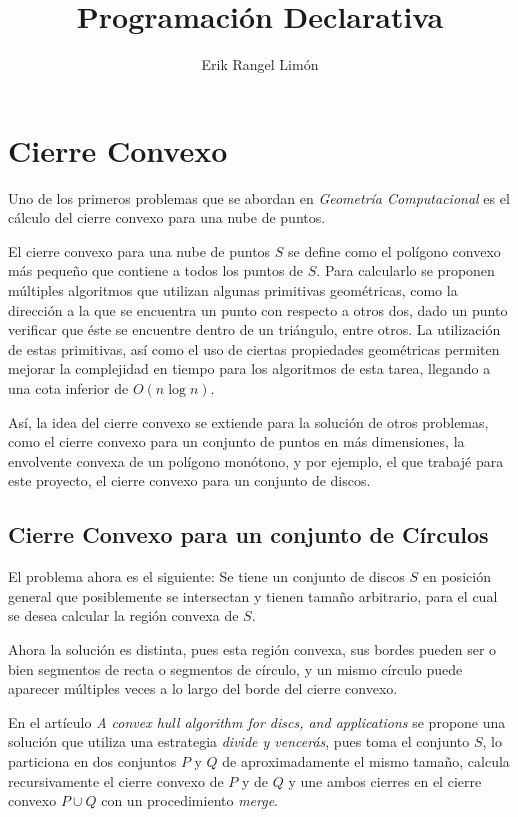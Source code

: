 \documentclass[12pt]{article}
\title{Programación Declarativa}
\author{Erik Rangel Limón}
\begin{document}

\maketitle

\section*{Cierre Convexo}

\noindent Uno de los primeros problemas que se abordan en \textit{Geometría Computacional} es el cálculo del cierre convexo para una nube de puntos.

El cierre convexo para una nube de puntos $S$ se define como el polígono convexo más pequeño que contiene a todos los puntos de $S$. Para calcularlo se proponen múltiples algoritmos que utilizan algunas primitivas geométricas, como la dirección a la que se encuentra un punto con respecto a otros dos, dado un punto verificar que éste se encuentre dentro de un triángulo, entre otros. La utilización de estas primitivas, así como el uso de ciertas propiedades geométricas permiten mejorar la complejidad en tiempo para los algoritmos de esta tarea, llegando a una cota inferior de $O(n\log n)$.

Así, la idea del cierre convexo se extiende para la solución de otros problemas, como el cierre convexo para un conjunto de puntos en más dimensiones, la envolvente convexa de un polígono monótono, y por ejemplo, el que trabajé para este proyecto, el cierre convexo para un conjunto de discos.

\subsection*{Cierre Convexo para un conjunto de Círculos}

\noindent El problema ahora es el siguiente: Se tiene un conjunto de discos $S$ en posición general que posiblemente se intersectan y tienen tamaño arbitrario, para el cual se desea calcular la región convexa de $S$.

Ahora la solución es distinta, pues esta región convexa, sus bordes pueden ser o bien segmentos de recta o segmentos de círculo, y un mismo círculo puede aparecer múltiples veces a lo largo del borde del cierre convexo.

En el artículo \textit{A convex hull algorithm for discs, and applications} se propone una solución que utiliza una estrategia \textit{divide y vencerás}, pues toma el conjunto $S$, lo particiona en dos conjuntos $P$ y $Q$ de aproximadamente el mismo tamaño, calcula recursivamente el cierre convexo de $P$ y de $Q$ y une ambos cierres en el cierre convexo $P\cup Q$ con un procedimiento \textit{merge}.
\end{document}
